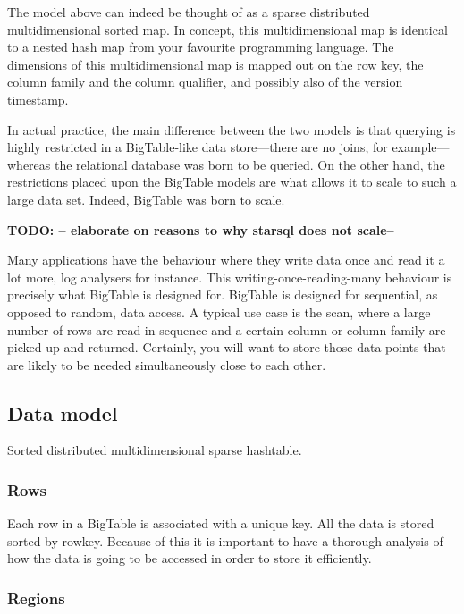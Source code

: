 \documentclass[a4paper,10pt]{book}
\begin{document}
The model above can indeed be thought of as a sparse distributed
multidimensional sorted map. In concept, this multidimensional map is
identical to a nested hash map from your favourite programming language. The
dimensions of this multidimensional map is mapped out on the row key, the
column family and the column qualifier, and possibly also of the version
timestamp.

In actual practice, the main difference between the two models is that
querying is highly restricted in a BigTable-like data store---there are no
joins, for example---whereas the relational database was born to be queried.
On the other hand, the restrictions placed upon the BigTable models are
what allows it to scale to such a large data set. Indeed, BigTable was born
to scale.

\textbf{TODO: -- elaborate on reasons to why starsql does not scale--}

Many applications have the behaviour where they write data once and read it
a lot more, log analysers for instance. This writing-once-reading-many
behaviour is precisely what BigTable is designed for. BigTable is designed
for sequential, as opposed to random, data access. A typical use case is
the scan, where a large number of rows are read in sequence and a certain
column or column-family are picked up and returned. Certainly, you will
want to store those data points that are likely to be needed simultaneously
close to each other. \cite{bigtable}


\subsection{Data model}

Sorted distributed multidimensional sparse hashtable.


\subsubsection{Rows}

Each row in a BigTable is associated with a unique key. All the data is
stored sorted by rowkey. Because of this it is important to have a thorough
analysis of how the data is going to be accessed in order to store it
efficiently.



\subsubsection{Regions}
\end{document}
